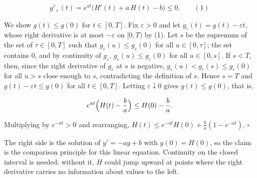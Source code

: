 \documentclass[11pt,a4paper]{article}
\begin{document}
\[g'_+(t)=e^{at}\bigl(H'(t)+a\,H(t)-b\bigr)\le0.\qquad(1)\]


We show \(g(t)\le g(0)\) for \(t\in[0,T]\). Fix \(\varepsilon>0\) and let \(g_\varepsilon(t)=g(t)-\varepsilon t\), whose right derivative is at most \(-\varepsilon\) on \([0,T)\) by (1). Let \(s\) be the supremum of the set of \(\tau\in[0,T]\) such that \(g_\varepsilon(u)\le g_\varepsilon(0)\) for all \(u\in[0,\tau]\); the set contains \(0\), and by continuity of \(g_\varepsilon\), \(g_\varepsilon(u)\le g_\varepsilon(0)\) for all \(u\in[0,s]\). If \(s<T\), then, since the right derivative of \(g_\varepsilon\) at \(s\) is negative, \(g_\varepsilon(u)<g_\varepsilon(s)\le g_\varepsilon(0)\) for all \(u>s\) close enough to \(s\), contradicting the definition of \(s\). Hence \(s=T\) and \(g(t)-\varepsilon t\le g(0)\) for all \(t\in[0,T]\). Letting \(\varepsilon\downarrow0\) gives \(g(t)\le g(0)\), that is,


\[e^{at}\Bigl(H(t)-\frac ba\Bigr)\le H(0)-\frac ba.\]


Multiplying by \(e^{-at}>0\) and rearranging, \(H(t)\le e^{-at}H(0)+\frac ba(1-e^{-at})\). \(\square\)




The right side is the solution of \(y'=-ay+b\) with \(y(0)=H(0)\), so the claim is the comparison principle for this linear equation. Continuity on the closed interval is needed: without it, \(H\) could jump upward at points where the right derivative carries no information about values to the left.
\end{document}
